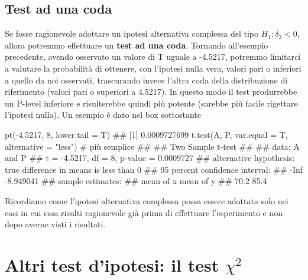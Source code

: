 \documentclass[a4paper,12pt,oneside]{book}
\newenvironment{Shaded}{\begin{snugshade}}{\end{snugshade}}
\newcommand{\DecValTok}[1]{#1}
\newcommand{\FloatTok}[1]{#1}
\newcommand{\SpecialCharTok}[1]{#1}
\newcommand{\StringTok}[1]{#1}
\newcommand{\CommentTok}[1]{#1}
\newcommand{\DocumentationTok}[1]{#1}
\newcommand{\FunctionTok}[1]{#1}
\newcommand{\AttributeTok}[1]{#1}
\newcommand{\NormalTok}[1]{#1}
\begin{document}
\hypertarget{test-ad-una-coda}{%
\subsection{Test ad una coda}\label{test-ad-una-coda}}

Se fosse ragionevole adottare un ipotesi alternativa complessa del tipo \(H_1: \delta_2 < 0\), allora potremmo effettuare un \textbf{test ad una coda}. Tornando all'esempio precedente, avendo osservato un valore di T uguale a -4.5217, potremmo limitarci a valutare la probabilità di ottenere, con l'ipotesi nulla vera, valori pari o inferiori a quello da noi osservati, trascurando invece l'altra coda della distribuzione di riferimento (valori pari o superiori a 4.5217). In questo modo il test produrrebbe un P-level inferiore e risulterebbe quindi più potente (sarebbe più facile rigettare l'ipotesi nulla). Un esempio è dato nel box sottostante

\begin{Shaded}
\begin{Highlighting}[]
\FunctionTok{pt}\NormalTok{(}\SpecialCharTok{{-}}\FloatTok{4.5217}\NormalTok{, }\DecValTok{8}\NormalTok{, }\AttributeTok{lower.tail =}\NormalTok{ T)}
\DocumentationTok{\#\# [1] 0.0009727699}
\FunctionTok{t.test}\NormalTok{(A, P, }\AttributeTok{var.equal =}\NormalTok{ T, }\AttributeTok{alternative =} \StringTok{"less"}\NormalTok{) }\CommentTok{\# più semplice}
\DocumentationTok{\#\# }
\DocumentationTok{\#\#  Two Sample t{-}test}
\DocumentationTok{\#\# }
\DocumentationTok{\#\# data:  A and P}
\DocumentationTok{\#\# t = {-}4.5217, df = 8, p{-}value = 0.0009727}
\DocumentationTok{\#\# alternative hypothesis: true difference in means is less than 0}
\DocumentationTok{\#\# 95 percent confidence interval:}
\DocumentationTok{\#\#       {-}Inf {-}8.949041}
\DocumentationTok{\#\# sample estimates:}
\DocumentationTok{\#\# mean of x mean of y }
\DocumentationTok{\#\#      70.2      85.4}
\end{Highlighting}
\end{Shaded}

Ricordiamo come l'ipotesi alternativa complessa possa essere adottata solo nei casi in cui essa risulti ragionevole già prima di effettuare l'esperimento e non dopo averne visti i risultati.

\hypertarget{altri-test-dipotesi-il-test-chi2}{%
\section{\texorpdfstring{Altri test d'ipotesi: il test \(\chi^2\)}{Altri test d'ipotesi: il test \textbackslash chi\^{}2}}\label{altri-test-dipotesi-il-test-chi2}}
\end{document}

